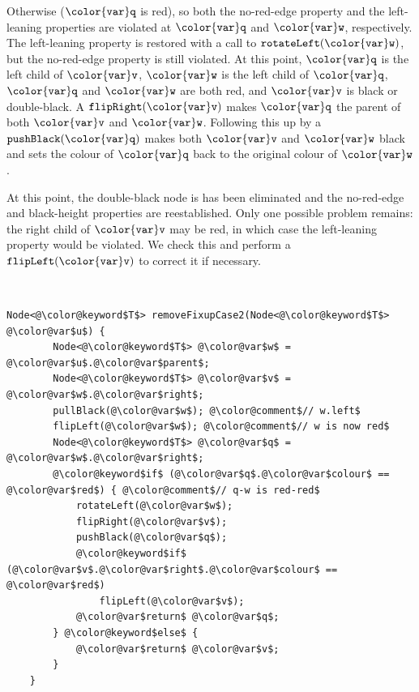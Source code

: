 \documentclass[10pt]{book}
\theoremstyle{plain}
\theoremstyle{definition}
\begin{document}
Otherwise (\ensuremath{\mathtt{{\color{var}q}}} is red), so both the no-red-edge property and the left-leaning
properties are violated at \ensuremath{\mathtt{{\color{var}q}}} and \ensuremath{\mathtt{{\color{var}w}}}, respectively.  The left-leaning
property is restored with a call to  
\ensuremath{\mathtt{rotateLeft({\color{var}w})}}, but the no-red-edge
property is still violated.  At this point, \ensuremath{\mathtt{{\color{var}q}}} is the left child of
\ensuremath{\mathtt{{\color{var}v}}}, \ensuremath{\mathtt{{\color{var}w}}} is the left child of \ensuremath{\mathtt{{\color{var}q}}}, \ensuremath{\mathtt{{\color{var}q}}} and \ensuremath{\mathtt{{\color{var}w}}} are both red, and \ensuremath{\mathtt{{\color{var}v}}}
is black or double-black.  A \ensuremath{\mathtt{flipRight({\color{var}v})}}  makes \ensuremath{\mathtt{{\color{var}q}}} the parent of
both \ensuremath{\mathtt{{\color{var}v}}} and \ensuremath{\mathtt{{\color{var}w}}}.  Following this up by a \ensuremath{\mathtt{pushBlack({\color{var}q})}} makes both \ensuremath{\mathtt{{\color{var}v}}}
and \ensuremath{\mathtt{{\color{var}w}}} black and sets the colour of \ensuremath{\mathtt{{\color{var}q}}} back to the original colour of \ensuremath{\mathtt{{\color{var}w}}}.

At this point, the double-black node is has been eliminated and the
no-red-edge and black-height properties are reestablished.  Only one possible problem remains: the right child of \ensuremath{\mathtt{{\color{var}v}}} may be red, in which
case the left-leaning property would be violated.  We check this and
perform a \ensuremath{\mathtt{flipLeft({\color{var}v})}} to correct it if necessary.


 \ \vspace{.5ex}\begin{Verbatim}[gobble=1,tabsize=2,frame=single,framerule=1.2pt,commandchars=\\@\$,label=\texttt{RedBlackTree},labelposition=topline]
	Node<@\color@keyword$T$> removeFixupCase2(Node<@\color@keyword$T$> @\color@var$u$) {
		Node<@\color@keyword$T$> @\color@var$w$ = @\color@var$u$.@\color@var$parent$;
		Node<@\color@keyword$T$> @\color@var$v$ = @\color@var$w$.@\color@var$right$;
		pullBlack(@\color@var$w$); @\color@comment$// w.left$
		flipLeft(@\color@var$w$); @\color@comment$// w is now red$
		Node<@\color@keyword$T$> @\color@var$q$ = @\color@var$w$.@\color@var$right$;
		@\color@keyword$if$ (@\color@var$q$.@\color@var$colour$ == @\color@var$red$) { @\color@comment$// q-w is red-red$
			rotateLeft(@\color@var$w$);
			flipRight(@\color@var$v$);
			pushBlack(@\color@var$q$);
			@\color@keyword$if$ (@\color@var$v$.@\color@var$right$.@\color@var$colour$ == @\color@var$red$)
				flipLeft(@\color@var$v$);
			@\color@var$return$ @\color@var$q$;
		} @\color@keyword$else$ {
			@\color@var$return$ @\color@var$v$;
		}
	}
\end{Verbatim}
\end{document}
